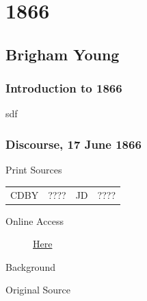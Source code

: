 \section{1866}

	\subsection{Brigham Young}
		\label{EMS-1866-BY}

		\subsubsection{Introduction to 1866}
		
			sdf
			
		\subsubsection{Discourse, 17 June 1866}
			\label{EMS-1866-BY-17-JUN-1866}
			
			\begin{description}
					\item[Print Sources]
				\end{description}

					\begin{tabular}{p{0.5in}p{1in}p{0.5in}p{1in}}
					CDBY	& ????		& JD 		& ???? \\
					\end{tabular}
				
				\begin{description}
					\item[Online Access] \href{https://drive.google.com/file/d/14XnR7IddynKj8xfApqJ921AGy42er2m2/view?usp=sharing}{Here}
				\end{description}
				
				\begin{description}
					\item[Background]
				\end{description}
				
					\phantom{.}
				
				\begin{description}
					\item[Original Source]
				\end{description}
				
